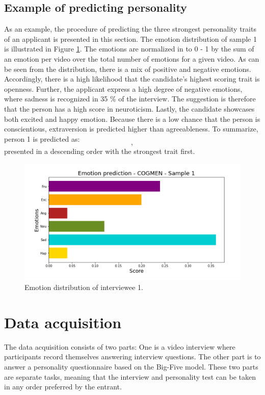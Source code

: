 \subsection{Example of predicting personality}
As an example, the procedure of predicting the three strongest personality traits of an applicant is presented in this section. The emotion distribution of sample 1 is illustrated in Figure \ref{fig:emotion_personality1}. The emotions are normalized in to 0 - 1 by the sum of an emotion per video over the total number of emotions for a given video. As can be seen from the distribution, there is a mix of positive and negative emotions. Accordingly, there is a high likelihood that the candidate's highest scoring trait is openness. Further, the applicant express a high degree of negative emotions, where sadness is recognized in 35 \% of the interview. The suggestion is therefore that the person has a high score in neuroticism. Lastly, the candidate showcases both excited and happy emotion. Because there is a low chance that the person is conscientious, extraversion is predicted higher than agreeableness. To summarize, person 1 is predicted as:
%
\begin{equation*}
    [Conscientiousness, Neuroticism, Extraversion],
\end{equation*}
%
presented in a descending order with the strongest trait first.
%
\begin{figure}[h]
  \centering
  \includegraphics[width=\textwidth]{figures/emotion_distribution_sample1.png}
  \caption{Emotion distribution of interviewee 1.}
  \label{fig:emotion_personality1}
\end{figure}
%

\section{Data acquisition}
The data acquisition consists of two parts: One is a video interview where participants record themselves answering interview questions. The other part is to answer a personality questionnaire based on the Big-Five model. These two parts are separate tasks, meaning that the interview and personality test can be taken in any order preferred by the entrant. 

